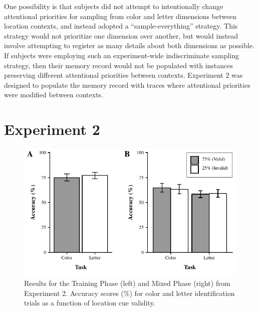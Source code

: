 \documentclass[english,,man,floatsintext]{apa6}
\begin{document}
One possibility is that subjects did not attempt to intentionally change
attentional priorities for sampling from color and letter dimensions
between location contexts, and instead adopted a
\enquote{sample-everything} strategy. This strategy would not prioritize
one dimension over another, but would instead involve attempting to
register as many details about both dimensions as possible. If subjects
were employing such an experiment-wide indiscriminate sampling strategy,
then their memory record would not be populated with instances
preserving different attentional priorities between contexts. Experiment
2 was designed to populate the memory record with traces where
attentional priorities were modified between contexts.

\section{Experiment 2}\label{experiment-2}

\begin{figure}
\centering
\includegraphics{figures/IC-figure3.pdf}
\caption{\label{fig:figure3}Results for the Training Phase (left) and Mixed Phase
(right) from Experiment 2. Accuracy scores (\%) for color and letter
identification trials as a function of location cue validity.}
\end{figure}
\end{document}
